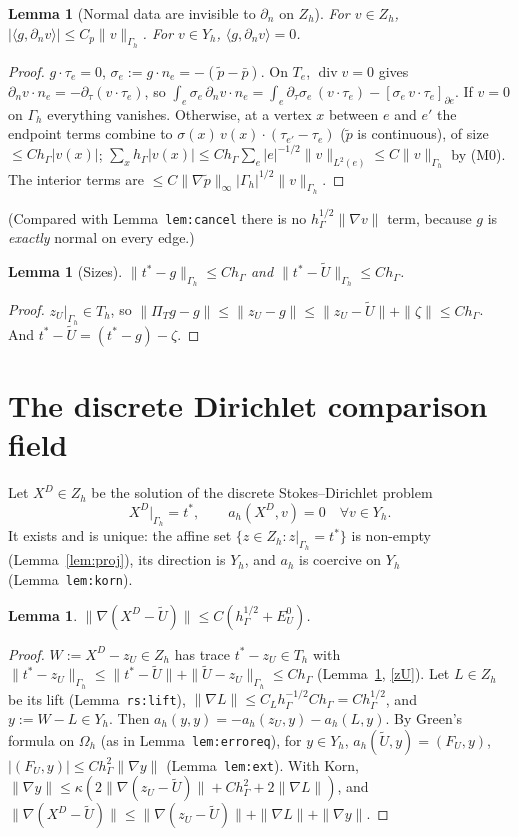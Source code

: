\documentclass[11pt]{article}
\newtheorem{lemma}[theorem]{Lemma}
\theoremstyle{remark}
\newcommand{\hG}{h_\Gamma}
\newcommand{\Gh}{\Gamma_h}
\newcommand{\Oh}{\Omega_h}
\newcommand{\Zh}{Z_h}
\newcommand{\Yh}{Y_h}
\newcommand{\Th}{T_h}
\newcommand{\PT}{\Pi_T}
\newcommand{\norm}[1]{\|#1\|}
\newcommand{\ip}[2]{\langle #1,#2\rangle}
\newcommand{\dn}{\partial_n}
\newcommand{\Ut}{\tilde U}
\newcommand{\pt}{\tilde p}
\newcommand{\pbar}{\bar p}
\newcommand{\EU}{E^{0}_{U}}
\renewcommand{\div}{\operatorname{div}}
\begin{document}
\begin{lemma}[Normal data are invisible to $\dn$ on $\Zh$]\label{lem:canc}
For $v\in\Zh$, $|\ip{g}{\dn v}|\le C_p\norm{v}_{\Gh}$. For $v\in\Yh$, $\ip{g}{\dn v}=0$.
\end{lemma}
\begin{proof}
$g\cdot\tau_e=0$, $\sigma_e:=g\cdot n_e=-(\pt-\pbar)$. On $T_e$, $\div v=0$ gives $\dn v\cdot n_e=-\partial_\tau(v\cdot\tau_e)$, so
$\int_e\sigma_e\,\dn v\cdot n_e=\int_e\partial_\tau\sigma_e\,(v\cdot\tau_e)-[\sigma_e\,v\cdot\tau_e]_{\partial e}$.
If $v=0$ on $\Gh$ everything vanishes. Otherwise, at a vertex $x$ between $e$ and $e'$ the endpoint terms combine to $\sigma(x)\,v(x)\cdot(\tau_{e'}-\tau_e)$ ($\pt$ is continuous), of size $\le C\hG|v(x)|$; $\sum_x\hG|v(x)|\le C\hG\sum_e|e|^{-1/2}\norm v_{L^2(e)}\le C\norm v_{\Gh}$ by (M0). The interior terms are $\le C\norm{\nabla\pt}_\infty|\Gh|^{1/2}\norm v_{\Gh}$.
\end{proof}
(Compared with Lemma~\texttt{lem:cancel} there is no $\hG^{1/2}\norm{\nabla v}$ term, because $g$ is \emph{exactly} normal on every edge.)

\begin{lemma}[Sizes]\label{lem:size}
$\norm{t^\ast-g}_{\Gh}\le C\hG$ and $\norm{t^\ast-\Ut}_{\Gh}\le C\hG$.
\end{lemma}
\begin{proof}
$z_U|_{\Gh}\in\Th$, so $\norm{\PT g-g}\le\norm{z_U-g}\le\norm{z_U-\Ut}+\norm\zeta\le C\hG$. And $t^\ast-\Ut=(t^\ast-g)-\zeta$.
\end{proof}

\section{The discrete Dirichlet comparison field}
Let $X^D\in\Zh$ be the solution of the discrete Stokes--Dirichlet problem
\[
X^D|_{\Gh}=t^\ast,\qquad a_h(X^D,v)=0\quad\forall v\in\Yh .
\]
It exists and is unique: the affine set $\{z\in\Zh:z|_{\Gh}=t^\ast\}$ is non-empty (Lemma~\ref{lem:proj}), its direction is $\Yh$, and $a_h$ is coercive on $\Yh$ (Lemma~\texttt{lem:korn}).

\begin{lemma}\label{lem:XD}
$\norm{\nabla(X^D-\Ut)}\le C(\hG^{1/2}+\EU)$.
\end{lemma}
\begin{proof}
$W:=X^D-z_U\in\Zh$ has trace $t^\ast-z_U\in\Th$ with $\norm{t^\ast-z_U}_{\Gh}\le\norm{t^\ast-\Ut}+\norm{\Ut-z_U}_{\Gh}\le C\hG$ (Lemma~\ref{lem:size}, \eqref{zU}). Let $L\in\Zh$ be its lift (Lemma~\texttt{rs:lift}), $\norm{\nabla L}\le C_L\hG^{-1/2}C\hG=C\hG^{1/2}$, and $y:=W-L\in\Yh$. Then $a_h(y,y)=-a_h(z_U,y)-a_h(L,y)$. By Green's formula on $\Oh$ (as in Lemma~\texttt{lem:erroreq}), for $y\in\Yh$, $a_h(\Ut,y)=(F_U,y)$, $|(F_U,y)|\le C\hG^2\norm{\nabla y}$ (Lemma~\texttt{lem:ext}). With Korn,
$\norm{\nabla y}\le\kappa(2\norm{\nabla(z_U-\Ut)}+C\hG^2+2\norm{\nabla L})$, and $\norm{\nabla(X^D-\Ut)}\le\norm{\nabla(z_U-\Ut)}+\norm{\nabla L}+\norm{\nabla y}$.
\end{proof}
\end{document}
